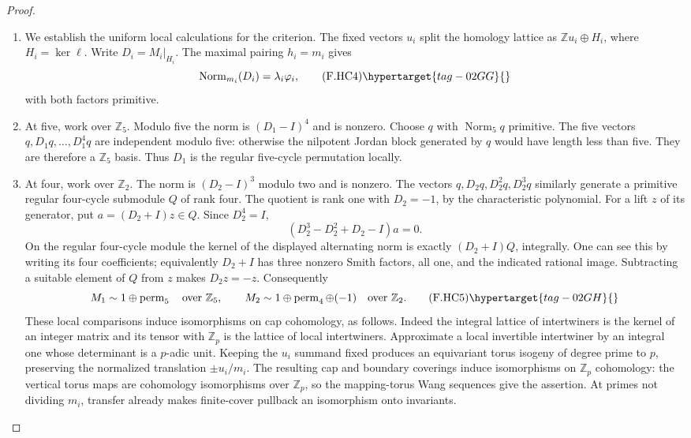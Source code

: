 \begin{proof}
\begin{enumerate}[label={$\langle1\rangle$\arabic*.}]
\item We establish the uniform local calculations for the criterion.
The fixed vectors $u_i$ split the homology lattice as
$\mathbb Zu_i\oplus H_i$, where $H_i=\ker\ell$.
Write $D_i=M_i|_{H_i}$.
The maximal pairing $h_i=m_i$ gives
\[
 \operatorname{Norm}_{m_i}(D_i)=\lambda_i\varphi_i ,
 \tag{F.HC4}\hypertarget{tag-02GG}{}\label{maps:eq:F.HC4}
\]
with both factors primitive.

\item At five, work over $\mathbb Z_5$.
Modulo five the norm is $(D_1-I)^4$ and is nonzero.
Choose $q$ with $\operatorname{Norm}_5q$ primitive.
The five vectors $q,D_1q,\ldots,D_1^4q$ are independent
modulo five: otherwise the nilpotent Jordan block generated
by $q$ would have length less than five.
They are therefore a $\mathbb Z_5$ basis.
Thus $D_1$ is the regular five-cycle permutation locally.

\item At four, work over $\mathbb Z_2$.
The norm is $(D_2-I)^3$ modulo two and is nonzero.
The vectors $q,D_2q,D_2^2q,D_2^3q$ similarly generate
a primitive regular four-cycle submodule $Q$ of rank four.
The quotient is rank one with $D_2=-1$, by the
characteristic polynomial.
For a lift $z$ of its generator, put $a=(D_2+I)z\in Q$.
Since $D_2^4=I$,
\[
 (D_2^3-D_2^2+D_2-I)a=0.
\]
On the regular four-cycle module the kernel of the
displayed alternating norm is exactly $(D_2+I)Q$,
integrally.  One can see this by writing its four
coefficients; equivalently $D_2+I$ has three nonzero
Smith factors, all one, and the indicated rational image.
Subtracting a suitable element of $Q$ from $z$ makes
$D_2z=-z$.
Consequently
\[
 M_1\sim 1\oplus\operatorname{perm}_5\quad\text{over }\mathbb Z_5,
 \qquad
 M_2\sim1\oplus\operatorname{perm}_4\oplus(-1)
 \quad\text{over }\mathbb Z_2 .
 \tag{F.HC5}\hypertarget{tag-02GH}{}\label{maps:eq:F.HC5}
\]
These local comparisons induce isomorphisms on cap cohomology, as follows.
Indeed the integral lattice of intertwiners is the kernel
of an integer matrix and its tensor with $\mathbb Z_p$
is the lattice of local intertwiners.
Approximate a local invertible intertwiner by an integral
one whose determinant is a $p$-adic unit.
Keeping the $u_i$ summand fixed produces an equivariant
torus isogeny of degree prime to $p$, preserving the
normalized translation $\pm u_i/m_i$.
The resulting cap and boundary coverings induce
isomorphisms on $\mathbb Z_p$ cohomology: the vertical
torus maps are cohomology isomorphisms over $\mathbb Z_p$,
so the mapping-torus Wang sequences give the assertion.
At primes not dividing $m_i$, transfer already makes
finite-cover pullback an isomorphism onto invariants.


\end{enumerate}
\end{proof}
